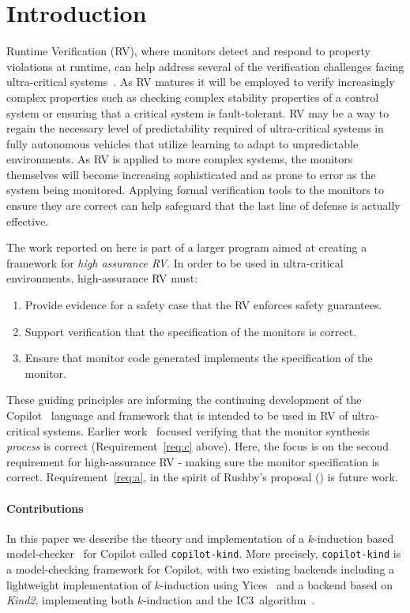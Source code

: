 \section{Introduction}\label{sec:intro}
Runtime Verification (RV), where monitors detect and respond to
property violations at runtime, can help address several of the
verification challenges facing ultra-critical
systems~\cite{pike-rv-11,rvRushby}.  As RV matures it will be employed to
verify increasingly complex properties such as checking complex
stability properties of a control system or ensuring that a critical
system is fault-tolerant. RV may be a
way to regain the necessary level of predictability required of
ultra-critical systems  in fully autonomous vehicles that
utilize learning to adapt to unpredictable environments.  As RV is applied to more complex systems, the
monitors themselves will become increasing sophisticated and as prone to error
as the system being monitored.  Applying formal verification
tools to the monitors to ensure they are correct can help safeguard
that the last line of defense is actually effective.

 The work reported on here is part of a larger
program aimed at creating a framework for \emph{high assurance RV}. In
order to be used in ultra-critical environments, high-assurance RV
must:
\begin{enumerate}
\item \label{req:a} Provide evidence for a safety case that the RV enforces safety guarantees.
\item \label{req:b} Support verification that the specification of the monitors
  is correct.
\item \label{req:c} Ensure that monitor code generated implements the specification of the
monitor.
\end{enumerate}

\noindent
These guiding principles are informing the continuing development of the
Copilot~\cite{copilot,pike-isse-13} language and framework that is intended to
be used in RV of ultra-critical systems.  Earlier work~\cite{pike-icfp-12}
focused verifying that the monitor synthesis \emph{process} is correct
(Requirement~\ref{req:c} above). Here, the focus
is on the second requirement for high-assurance RV - making sure the monitor
specification is correct. Requirement~\ref{req:a}, in the spirit of Rushby's
proposal (\cite{rvRushby}) is future work.

\paragraph{Contributions}
In this paper we describe the theory and implementation of a $k$-induction based
model-checker~\cite{Sheeran00,EenS03} for Copilot called
\texttt{copilot-kind}. More precisely, \texttt{copilot-kind} is a model-checking
framework for Copilot, with two existing backends including a lightweight
implementation of $k$-induction using Yices~\cite{Dutertre:cav2014} and a backend based on
\emph{Kind2}, implementing both $k$-induction and the IC3~algorithm~\cite{Somenzi-FMCAD11}.

